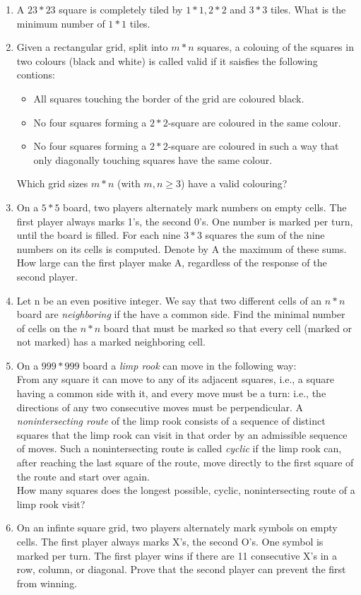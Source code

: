 \documentclass[11pt,a5paper]{article}
\begin{document}
\begin{enumerate}
\item{A $23*23$ square is completely tiled by $1*1, 2*2$ and $3*3$ tiles. What is the minimum number of $1*1$ tiles.}

\item{Given a rectangular grid, split into $m*n$ squares, a colouing of the squares in two colours (black and white) is called valid if it saisfies the following contions:
\begin{itemize}
\item{All squares touching the border of the grid are coloured black.}
\item{No four squares forming a $2*2$-square are coloured in the same colour.}
\item{No four squares forming a $2*2$-square are coloured in such a way that only diagonally touching squares have the same colour.}
\end{itemize}
Which grid sizes $m*n$ (with $m,n \geq 3$) have a valid colouring?}

\item{On a $5*5$ board, two players alternately mark numbers on empty cells. The first player always marks 1's, the second 0's. One number is marked per turn, until the board is filled. For each nine $3*3$ squares the sum of the nine numbers on its cells is computed. Denote by A the maximum of these sums. How large can the first player make A, regardless of the response of the second player.}

\item{Let n be an even positive integer. We say that two different cells of an $n*n$ board are \emph{neighboring} if the have a common side. Find the minimal number of cells on the $n*n$ board that must be marked so that every cell (marked or not marked) has a marked neighboring cell.}


\item{On a $999*999$ board a \emph{limp rook} can move in the following way:\\
From any square it can move to any of its adjacent squares, i.e., a square having a common side with it, and every move must be a turn: i.e., the directions of any two consecutive moves must be perpendicular. A \emph{nonintersecting route} of the limp rook consists of a sequence of distinct squares that the limp rook can visit in that order by an admissible sequence of moves. Such a nonintersecting route is called \emph{cyclic} if the limp rook can, after reaching the last square of the route, move directly to the first square of the route and start over again.\\
How many squares does the longest possible, cyclic, nonintersecting route of a limp rook visit?}

\item{On an infinte square grid, two players alternately mark symbols on empty cells. The first player always marks X's, the second O's. One symbol is marked per turn. The first player wins if there are 11 consecutive X's in a row, column, or diagonal. Prove that the second player can prevent the first from winning.}

\end{enumerate}
\end{document}
